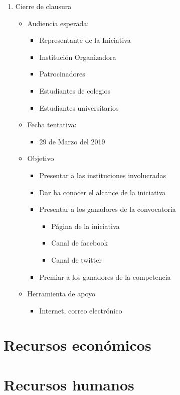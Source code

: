 \documentclass{article}
\begin{document}
\begin{enumerate}
\item Cierre de clausura

\begin{itemize}
\item Audiencia esperada:
\begin{itemize}
\item Representante de la Iniciativa
\item Institución Organizadora
\item Patrocinadores
\item Estudiantes de colegios
\item Estudiantes universitarios
\end{itemize}
\item Fecha tentativa:
\begin{itemize}
\item 29 de Marzo del 2019
\end{itemize}
\item Objetivo
\begin{itemize}
\item Presentar a las instituciones involucradas
\item Dar ha conocer el alcance de la iniciativa
\item Presentar a los ganadores de la convocatoria
\begin{itemize}
\item Página de la iniciativa 
\item Canal de facebook
\item Canal de twitter
\end{itemize}
\item Premiar a los ganadores de la competencia
\end{itemize}
\item Herramienta de apoyo
\begin{itemize}
\item Internet, correo electrónico
\end{itemize}
\end{itemize}


\end{enumerate}



\section{Recursos económicos}

\section{Recursos humanos}
\end{document}
